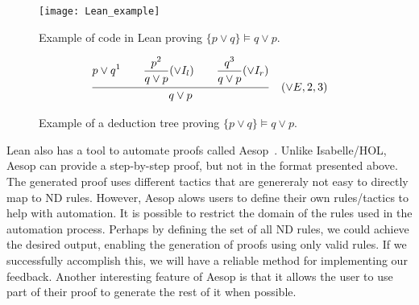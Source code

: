 \begin{figure}[htbp]
    \centering
    \texttt{[image: Lean\_example]}
    \caption{Example of code in Lean proving \(\{p \lor q\} \models q \lor p \).}
    \label{img:lean_example}
\end{figure}

\begin{figure}[h!]
    \centering
        \[
            \frac{ {\displaystyle {p \lor q}^1 
            \quad \quad \displaystyle \frac{\displaystyle p^2}{q \lor p \strut} (\lor I_l) \strut}
            \quad \quad \displaystyle \frac{\displaystyle q^3}{q \lor p \strut} (\lor I_r) \strut}
            {\displaystyle q \lor p \strut} \quad (\vee E, 2, 3)
          \]
          \caption{Example of a deduction tree proving \(\{p \lor q\} \models q \lor p \).}
          \label{tab:lean_example}
      \end{figure}

Lean also has a tool to automate proofs called Aesop~\cite{leanprovercommunity_2021_github}. Unlike Isabelle/HOL, Aesop can provide a step-by-step proof, but not in the format presented above. The generated proof uses different tactics that are genereraly not easy to directly map to \gls{ND} rules. However, Aesop alows users to define their own rules/tactics to help with automation. It is possible to restrict the domain of the rules used in the automation process. Perhaps by defining the set of all \gls{ND} rules, we could achieve the desired output, enabling the generation of proofs using only valid rules. If we successfully accomplish this, we will have a reliable method for implementing our feedback. Another interesting feature of Aesop is that it allows the user to use part of their proof to generate the rest of it when possible.





